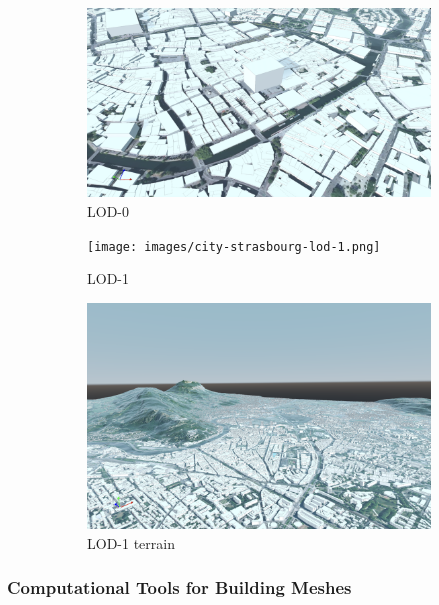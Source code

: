 \documentclass[runningheads]{llncs}
\begin{document}
\begin{figure}[htbp]
\centering
\begin{subfigure}{.4\textwidth}
  \centering
  \includegraphics[width=\linewidth]{images/city-strasbourg-lod-0.png}
  \caption{LOD-0}
  \label{fig:city-strasbourg-lod0}
\end{subfigure}%
\begin{subfigure}{.4\textwidth}
  \centering
  \texttt{[image: images/city-strasbourg-lod-1.png]}
  \caption{LOD-1}
  \label{fig:city-strasbourg-lod1}
\end{subfigure}
\begin{subfigure}{.4\textwidth}
  \centering
  \includegraphics[width=\linewidth]{images/city-grenoble-terrain.png}
  \caption{LOD-1 terrain}
  \label{fig:city-grenoble-terrain}
\end{subfigure}
\caption{}
\label{fig:city-strasbourg}
\end{figure}

\subsubsection{Computational Tools for Building Meshes}
\end{document}
